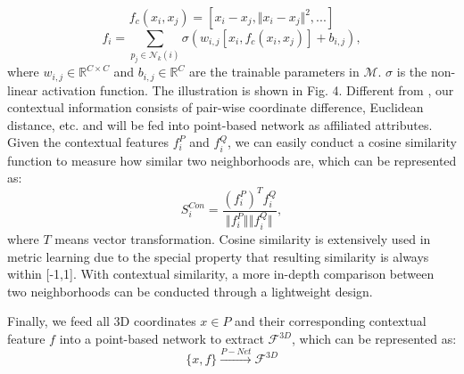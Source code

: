 \documentclass[letterpaper, 10 pt, conference]{ieeeconf}
\begin{document}
\begin{equation}
f_{c}(x_{i},x_{j}) = [x_{i}-x_{j},\Vert x_{i}-x_{j}\Vert^{2},...]
\end{equation}
\begin{equation}
f_{i} = \sum_{p_j\in{\mathcal{N}_{k}(i)}}\mathcal{\sigma}(w_{i,j}[x_{i},f_{c}(x_{i},x_{j})]+b_{i,j}),
\end{equation}
where $w_{i,j} \in \mathbb{R}^{C \times C}$ and $b_{i,j} \in \mathbb{R}^{C}$ are the trainable parameters in $\mathcal{M}$. $\sigma$ is the non-linear activation function. The illustration is shown in Fig. 4. Different from \cite{NIPS2019_8706}, our contextual information consists of pair-wise coordinate difference, Euclidean distance, etc. and will be fed into point-based network as affiliated attributes.
Given the contextual features $f^P_{i}$ and $f^Q_{i}$, we can easily conduct a cosine similarity function to measure how similar two neighborhoods are, which can be represented as:
\begin{equation}
S^{Con}_{i} = \frac{{(f^P_{i})^T  f^Q_{i}}}{\Vert f^P_{i}\Vert_{} \Vert f^Q_{i}\Vert_{}},
\end{equation}
where $T$ means vector transformation. Cosine similarity is extensively used in metric learning \cite{nguyen2010cosine,wojke2018deep} due to the special property that resulting similarity is always within [-1,1]. With contextual similarity,  a more in-depth comparison between two neighborhoods can be conducted through a lightweight design.

Finally, we feed all 3D coordinates $x \in P$ and their corresponding contextual feature $f$ into a point-based network to extract $\mathcal{F}^{3D}$, which can be represented as:
\begin{equation}
\{x,f\}\stackrel{P-Net}{\longrightarrow}{\mathcal{F}^{3D}}
\end{equation}
\end{document}
